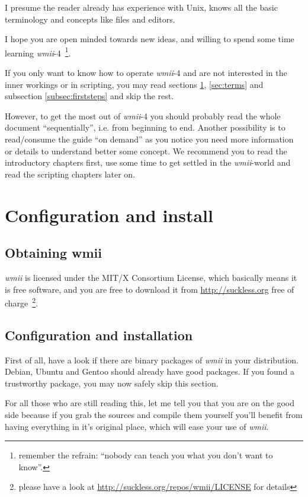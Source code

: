 \documentclass[12pt,a4paper]{article} %
\newcommand{\hrefx}[1]{\href{#1}{#1}} %
\newcommand{\wmii}{\emph{wmii}}
\begin{document}
    I presume the reader already has experience with Unix, knows all
    the basic terminology and concepts like files and editors.

    I hope you are open minded towards new ideas, and willing to spend some
    time learning \wmii-4~\footnote{remember the refrain: ``nobody
    can teach you what you don't want to know''.}.

    If you only want to know how to operate \wmii-4 and are not
    interested in the inner workings or in scripting, you may read
    sections \ref{sec:conf&install}, \ref{sec:terms} and subsection
    \ref{subsec:firststeps} and skip the rest.

    However, to get the most out of \wmii-4 you should probably read
    the whole document ``sequentially'', i.e. from beginning to end.
    Another possibility is to read/consume the guide ``on demand'' as
    you notice you need more information or details to understand
    better some concept. We recommend you to read the introductory
    chapters first, use some time to get settled in the \wmii-world
    and read the scripting chapters later on.
    
    \section{Configuration and install}
    \label{sec:conf&install}

    \subsection{Obtaining wmii}

    \wmii{} is licensed under the MIT/X Consortium License, which
    basically means it is free software, and you are free to download
    it from \hrefx{http://suckless.org} free of charge~\footnote{ please have
      a look at \hrefx{http://suckless.org/repos/wmii/LICENSE}  for
      details}.
    
    \subsection{Configuration and installation}
    
    First of all, have a look if there are binary packages of \wmii{} in
    your distribution. Debian, Ubuntu and Gentoo should already have
    good packages. If you found a trustworthy package, you may now safely
    skip this section.

    For all those who are still reading this, let me tell you that you are
    on the good side because if you grab the sources and compile them yourself
    you'll benefit from having everything in it's original place, which will
    ease your use of \wmii.
    
\end{document}
